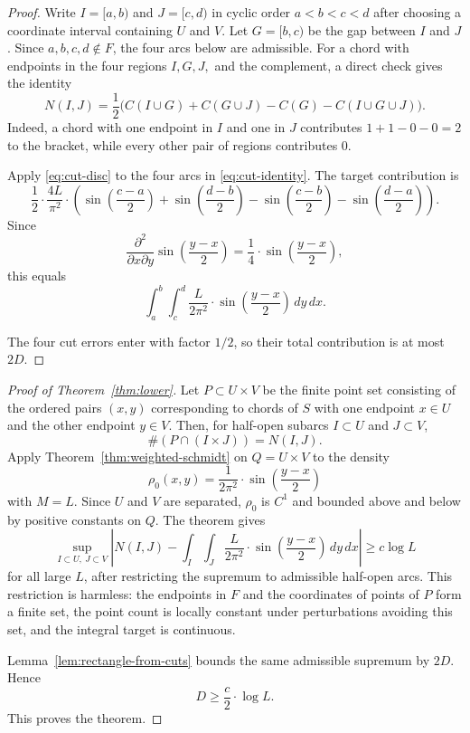 \documentclass[11pt]{article}
\theoremstyle{definition}
\begin{document}
\begin{proof}
Write $I=[a,b)$ and $J=[c,d)$ in cyclic order $a<b<c<d$ after choosing a coordinate interval containing $U$ and $V$.  Let $G=[b,c)$ be the gap between $I$ and $J$.  Since $a,b,c,d\notin F$, the four arcs below are admissible.  For a chord with endpoints in the four regions $I,G,J,$ and the complement, a direct check gives the identity
\begin{equation}\label{eq:cut-identity}
        N(I,J)=\frac12\bigl(C(I\cup G)+C(G\cup J)-C(G)-C(I\cup G\cup J)\bigr).
\end{equation}
Indeed, a chord with one endpoint in $I$ and one in $J$ contributes $1+1-0-0=2$ to the bracket, while every other pair of regions contributes $0$.

\bigskip
\noindent
Apply \eqref{eq:cut-disc} to the four arcs in \eqref{eq:cut-identity}.  The target contribution is
\[
\frac12\cdot\frac{4L}{\pi^2}\cdot
\left(
\sin\left(\frac{c-a}{2}\right)+\sin\left(\frac{d-b}{2}\right)-\sin\left(\frac{c-b}{2}\right)-\sin\left(\frac{d-a}{2}\right)
\right).
\]
Since
\[
        \frac{\partial^2}{\partial x\partial y}\sin\left(\frac{y-x}{2}\right)
        =\frac14\cdot\sin\left(\frac{y-x}{2}\right),
\]
this equals
\[
        \int_a^b\int_c^d \frac{L}{2\pi^2}\cdot\sin\left(\frac{y-x}{2}\right)\,dy\,dx.
\]

\smallskip
\noindent
The four cut errors enter with factor $1/2$, so their total contribution is at most $2D$.
\end{proof}

\begin{proof}[Proof of Theorem~\ref{thm:lower}]
Let $P\subset U\times V$ be the finite point set consisting of the ordered pairs $(x,y)$ corresponding to chords of $S$ with one endpoint $x\in U$ and the other endpoint $y\in V$.  Then, for half-open subarcs $I\subset U$ and $J\subset V$,
\[
        \#(P\cap(I\times J))=N(I,J).
\]
Apply Theorem~\ref{thm:weighted-schmidt} on $Q=U\times V$ to the density
\[
        \rho_0(x,y)=\frac{1}{2\pi^2}\cdot\sin\left(\frac{y-x}{2}\right)
\]
with $M=L$. Since $U$ and $V$ are separated, $\rho_0$ is $C^1$ and bounded above and below by positive constants on $Q$.  The theorem gives
\[
        \sup_{I\subset U,\ J\subset V}
        \left|
        N(I,J)-
        \int_I\int_J \frac{L}{2\pi^2}\cdot\sin\left(\frac{y-x}{2}\right)\,dy\,dx
        \right|
        \ge c\log L
\]
for all large $L$, after restricting the supremum to admissible half-open arcs.  This restriction is harmless: the endpoints in $F$ and the coordinates of points of $P$ form a finite set, the point count is locally constant under perturbations avoiding this set, and the integral target is continuous.

\smallskip
\noindent
Lemma~\ref{lem:rectangle-from-cuts} bounds the same admissible supremum by $2D$.  Hence
\[
        D\ge \frac{c}{2} \cdot \log L.
\]
This proves the theorem.
\end{proof}
\end{document}
